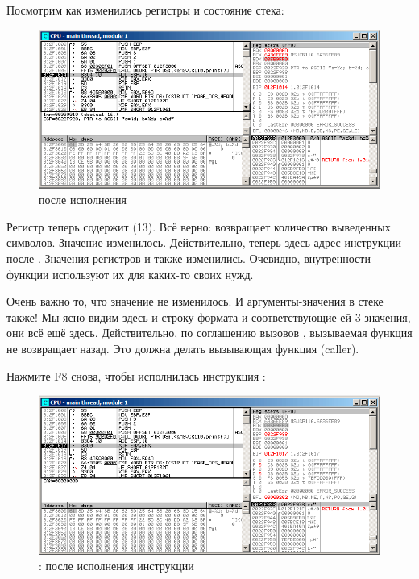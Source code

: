 Посмотрим как изменились регистры и состояние стека: 

\begin{figure}[H]
\centering
\includegraphics[scale=\FigScale]{patterns/03_printf/x86/olly3_3.png}
\caption{\olly после исполнения \printf}
\label{fig:printf3_olly_3}
\end{figure}

Регистр \EAX теперь содержит  (13).
Всё верно: \printf возвращает количество выведенных символов.
Значение \EIP изменилось. Действительно, теперь здесь адрес инструкции после .
Значения регистров \ECX и \EDX также изменились.
Очевидно, внутренности функции \printf используют их для каких-то своих нужд.

Очень важно то, что значение \ESP не изменилось. И аргументы-значения в стеке также!
Мы ясно видим здесь и строку формата и соответствующие ей 3 значения, они всё ещё здесь.
Действительно, по соглашению вызовов , вызываемая функция не возвращает \ESP назад.
Это должна делать вызывающая функция (\gls{caller}).

\clearpage
Нажмите F8 снова, чтобы исполнилась инструкция :

\begin{figure}[H]
\centering
\includegraphics[scale=\FigScale]{patterns/03_printf/x86/olly3_4.png}
\caption{\olly: после исполнения инструкции }
\label{fig:printf3_olly_4}
\end{figure}

